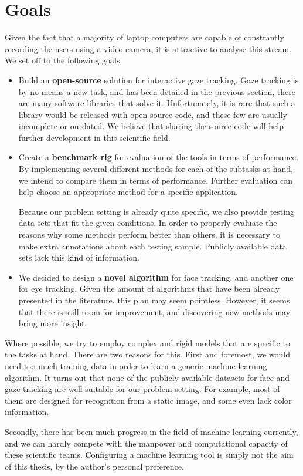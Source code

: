 \chapter{Goals}

Given the fact that a majority of laptop computers are capable of constrantly recording the users using a video camera, it is attractive to analyse this stream.
We set off to the following goals:
\begin{itemize}

\item Build an \textbf{open-source} solution for interactive gaze tracking.
Gaze tracking is by no means a new task, and has been detailed in the previous section, there are many software libraries that solve it.
Unfortunately, it is rare that such a library would be released with open source code, and these few are usually incomplete or outdated.
We believe that sharing the source code will help further development in this scientific field.

\item Create a \textbf{benchmark rig} for evaluation of the tools in terms of performance.
By implementing several different methods for each of the subtasks at hand, we intend to compare them in terms of performance.
Further evaluation can help choose an appropriate method for a specific application.

Because our problem setting is already quite specific, we also provide testing data sets that fit the given conditions.
In order to properly evaluate the reasons why some methods perform better than others, it is necessary to make extra annotations about each testing sample.
Publicly available data sets lack this kind of information.

\item We decided to design a \textbf{novel algorithm} for face tracking, and another one for eye tracking.
Given the amount of algorithms that have been already presented in the literature, this plan may seem pointless.
However, it seems that there is still room for improvement, and discovering new methods may bring more insight.

\end{itemize}

Where possible, we try to employ complex and rigid models that are specific to the tasks at hand.
There are two reasons for this.
First and foremost, we would need too much training data in order to learn a generic machine learning algorithm.
It turns out that none of the publicly available datasets for face and gaze tracking are well suitable for our problem setting.
For example, most of them are designed for recognition from a static image, and some even lack color information.

Secondly, there has been much progress in the field of machine learning currently, and we can hardly compete with the manpower and computational capacity of these scientific teams.
Configuring a machine learning tool is simply not the aim of this thesis, by the author's personal preference.
